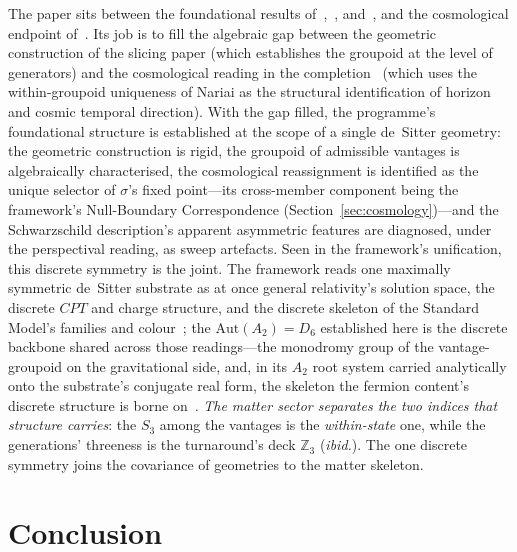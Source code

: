 \documentclass[11pt,a4paper]{article}
\theoremstyle{definition}
\begin{document}
The paper sits between the foundational results of~\cite{JanzenBHcausality},~\cite{JanzenCircle}, and~\cite{JanzenSlicing}, and the cosmological endpoint of~\cite{JanzenCRframework}. Its job is to fill the algebraic gap between the geometric construction of the slicing paper (which establishes the groupoid at the level of generators) and the cosmological reading in the completion~\cite{JanzenCRframework} (which uses the within-groupoid uniqueness of Nariai as the structural identification of horizon and cosmic temporal direction). With the gap filled, the programme's foundational structure is established at the scope of a single de~Sitter geometry: the geometric construction is rigid, the groupoid of admissible vantages is algebraically characterised, the cosmological reassignment is identified as the unique selector of $\sigma$'s fixed point---its cross-member component being the framework's Null-Boundary Correspondence (Section~\ref{sec:cosmology})---and the Schwarzschild description's apparent asymmetric features are diagnosed, under the perspectival reading, as sweep artefacts. Seen in the framework's unification, this discrete symmetry is the joint. The framework reads one maximally symmetric de~Sitter substrate as at once general relativity's solution space, the discrete $CPT$ and charge structure, and the discrete skeleton of the Standard Model's families and colour~\cite{JanzenCRframework}; the $\mathrm{Aut}(A_{2})=D_{6}$ established here is the discrete backbone shared across those readings---the monodromy group of the vantage-groupoid on the gravitational side, and, in its $A_{2}$ root system carried analytically onto the substrate's conjugate real form, the skeleton the fermion content's discrete structure is borne on~\cite{JanzenMatter,JanzenBoundary,JanzenGeometricCore}. \emph{The matter sector separates the two indices that structure carries}: the $S_{3}$ among the vantages is the \emph{within-state} one, while the generations' threeness is the turnaround's deck $\mathbb{Z}_{3}$ (\emph{ibid.}). The one discrete symmetry joins the covariance of geometries to the matter skeleton.

\section{Conclusion}\label{sec:conclusion}
\end{document}
